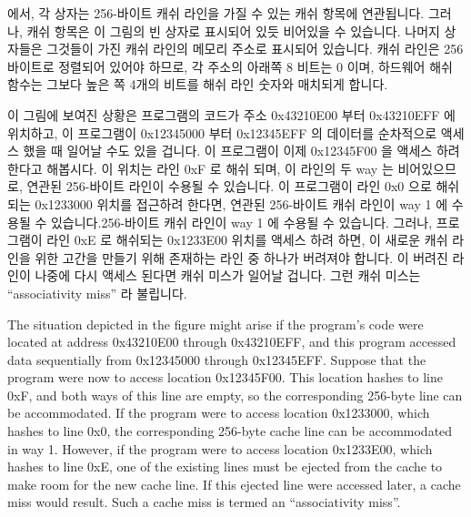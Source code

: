  에서, 각 상자는 256-바이트 캐쉬 라인을
가질 수 있는 캐쉬 항목에 연관됩니다.
그러나, 캐쉬 항목은 이 그림의 빈 상자로 표시되어 있듯 비어있을 수 있습니다.
나머지 상자들은 그것들이 가진 캐쉬 라인의 메모리 주소로 표시되어 있습니다.
캐쉬 라인은 256 바이트로 정렬되어 있어야 하므로, 각 주소의 아래쪽 8 비트는 0
이며, 하드웨어 해쉬 함수는 그보다 높은 쪽 4개의 비트를 해쉬 라인 숫자와
매치되게 합니다.

\iffalse

In \cref{fig:app:whymb:CPU Cache Structure},
each box corresponds to a cache entry, which
can contain a 256-byte cache line.
However, a cache entry can be empty, as indicated by the empty boxes
in the figure.
The rest of the boxes are flagged with the memory address of the cache line
that they contain.
Since the cache lines must be 256-byte aligned, the low eight bits of
each address are
zero, and the choice of hardware hash function means that the next-higher
four bits match the hash line number.

\fi

이 그림에 보여진 상황은 프로그램의 코드가 주소 0x43210E00 부터 0x43210EFF 에
위치하고, 이 프로그램이 0x12345000 부터 0x12345EFF 의 데이터를 순차적으로
액세스 했을 때 일어날 수도 있을 겁니다.
이 프로그램이 이제 0x12345F00 을 액세스 하려 한다고 해봅시다.
이 위치는 라인 0xF 로 해쉬 되며, 이 라인의 두 way 는 비어있으므로, 연관된
256-바이트 라인이 수용될 수 있습니다.
이 프로그램이 라인 0x0 으로 해쉬 되는 0x1233000 위치를 접근하려 한다면, 연관된
256-바이트 캐쉬 라인이 way 1 에 수용될 수 있습니다.256-바이트 캐쉬 라인이 way 1
에 수용될 수 있습니다.
그러나, 프로그램이 라인 0xE 로 해쉬되는 0x1233E00 위치를 액세스 하려 하면, 이
새로운 캐쉬 라인을 위한 고간을 만들기 위해 존재하는 라인 중 하나가 버려져야
합니다.
이 버려진 라인이 나중에 다시 액세스 된다면 캐쉬 미스가 일어날 겁니다.
그런 캐쉬 미스는 ``associativity miss'' 라 불립니다.

\iffalse

The situation depicted in the figure might arise if the program's code
were located at address 0x43210E00 through 0x43210EFF, and this program
accessed data sequentially from 0x12345000 through 0x12345EFF\@.
Suppose that the program were now to access location 0x12345F00.
This location hashes to line 0xF, and both ways of this line are
empty, so the corresponding 256-byte line can be accommodated.
If the program were to access location 0x1233000, which hashes to line
0x0, the corresponding 256-byte cache line can be accommodated in
way 1.
However, if the program were to access location 0x1233E00, which hashes
to line 0xE, one of the existing lines must be ejected from the cache
to make room for the new cache line.
If this ejected line were accessed later, a cache miss would result.
Such a cache miss is termed an ``associativity miss''.

